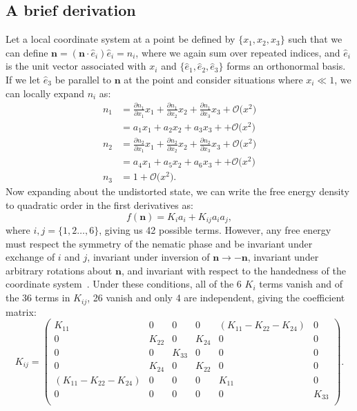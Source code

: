 \subsection{A brief derivation}
Let a local coordinate system at a point be defined by $\{x_1, x_2, x_3 \}$ such that we can define $\mathbf{n} = (\mathbf{n} \cdot \hat{e}_i) \hat{e}_i = n_i$, where we again sum over repeated indices, and $\hat{e}_i$ is the unit vector associated with $x_i$ and $\{\hat{e}_1, \hat{e}_2, \hat{e}_3 \}$ forms an orthonormal basis.
If we let $\hat{e}_3$ be parallel to $\mathbf{n}$ at the point and consider situations where $x_i \ll 1$, we can locally expand $n_i$ as:
\begin{align}
  n_1 &= \frac{\partial n_1}{\partial x_1}x_1 + \frac{\partial n_1}{\partial x_2}x_2 + \frac{\partial n_1}{\partial x_3}x_3 + \mathcal{O}\big (x^2 \big ) \nonumber \\
      &= a_1 x_1 + a_2 x_2 + a_3 x_3 + + \mathcal{O}\big (x^2 \big )\label{e:2-LocalCoordA}  \\
  n_2 &= \frac{\partial n_2}{\partial x_1}x_1 + \frac{\partial n_2}{\partial x_2}x_2 + \frac{\partial n_2}{\partial x_3}x_3 + \mathcal{O}\big (x^2 \big ) \nonumber  \\
      &= a_4 x_1 + a_5 x_2 + a_6 x_3 + + \mathcal{O}\big (x^2 \big )\label{e:2-LocalCoordB}  \\
  n_3 &= 1 + \mathcal{O}\big (x^2 \big ). \nonumber
\end{align}
Now expanding about the undistorted state, we can write the free energy density to quadratic order in the first derivatives as:
\begin{equation}
  f(\mathbf{n}) = K_i a_i + K_{ij} a_i a_j,\label{e:2-FrankGeneralExpansion}
\end{equation}
where $i,j = \{ 1,2 \dots, 6 \}$, giving us 42 possible terms.
However, any free energy must respect the symmetry of the nematic phase and be invariant under exchange of $i$ and $j$, invariant under inversion of $\mathbf{n} \rightarrow -\mathbf{n}$, invariant under arbitrary rotations about $\mathbf{n}$, and invariant with respect to the handedness of the coordinate system~\cite{RN61}.
Under these conditions, all of the 6 $K_i$ terms vanish and of the 36 terms in $K_{ij}$, 26 vanish and only 4 are independent, giving the coefficient matrix:
\begin{equation}
  K_{ij} =
  \begin{pmatrix}
    K_{11} & 0 & 0 & 0 & (K_{11}-K_{22}-K_{24}) & 0 \\
    0 & K_{22} & 0 & K_{24} & 0 & 0 \\
    0 & 0 & K_{33} & 0 & 0 & 0 \\
    0 & K_{24} & 0 & K_{22} & 0 & 0 \\
    (K_{11}-K_{22}-K_{24}) & 0 & 0 & 0 & K_{11} & 0 \\
    0 & 0 & 0 & 0 & 0 & K_{33} \\
  \end{pmatrix}.\label{e:2-Kijreduced}
\end{equation}
